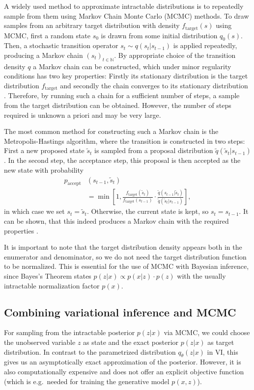 A widely used method to approximate intractable distributions is to repeatedly sample from them using Markov Chain Monte Carlo (MCMC) methods. To draw samples from an arbitrary target distribution with density $f_\textrm{target}(s)$ using MCMC, first a random state $s_0$ is drawn from some initial distribution $q_0(s)$. Then, a stochastic transition operator $s_{t} \sim q(s_t|s_{t-1})$ is applied repeatedly, producing a Markov chain $(s_t)_{t \in \mathbb{N}}$. By appropriate choice of the transition density $q$ a Markov chain can be constructed, which under minor regularity conditions has two key properties: Firstly its stationary distribution is the target distribution $f_\textrm{target}$ and secondly the chain converges to its stationary distribution \parencite{Roberts2004}. Therefore, by running such a chain for a sufficient number of steps, a sample from the target distribution can be obtained. However, the number of steps required is unknown a priori and may be very large.

The most common method for constructing such a Markov chain is the Metropolis-Hastings algorithm, where the transition is constructed in two steps: First a new proposed state $\tilde{s}_t$ is sampled from a proposal distribution $\tilde{q}(\tilde{s}_t|s_{t-1})$. In the second step, the acceptance step, this proposal is then accepted as the new state with probability 
\begin{equation} \label{eq:Metropolis-Hastings}
\begin{split}
p_{\textrm{accept}}&(s_{t-1}, \tilde{s}_t) \\
&= \min \left[ 1, \frac{f_\textrm{target}(\tilde{s}_t)}{f_\textrm{target}(s_{t-1})} \cdot \frac{\tilde{q}(s_{t-1}|\tilde{s}_t)}{\tilde{q}(\tilde{s}_t|s_{t-1})} \right],
\end{split}
\end{equation}
in which case we set $s_t = \tilde{s}_t$. Otherwise, the current state is kept, so $s_t = s_{t-1}$. It can be shown, that this indeed produces a Markov chain with the required properties \parencite{Roberts2004}. 

It is important to note that the target distribution density appears both in the enumerator and denominator, so we do not need the target distribution function to be normalized. This is essential for the use of MCMC with Bayesian inference, since Bayes's Theorem states $p(z|x) \propto p(x|z) \cdot p(z)$ with the usually intractable normalization factor $p(x)$.

\subsection{Combining variational inference and MCMC}
\label{sec:MCVI}
For sampling from the intractable posterior $p(z|x)$ via MCMC, we could choose the unobserved variable $z$ as state and the exact posterior $p(z|x)$ as target distribution. In contrast to the parametrized distribution $q_\theta(z|x)$ in VI, this gives us an asymptotically exact approximation of the posterior. However, it is also computationally expensive and does not offer an explicit objective function (which is e.g.\ needed for training the generative model $p(x, z)$).

